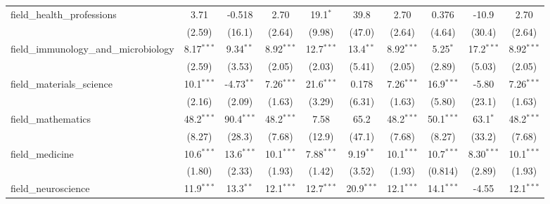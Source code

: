 \begin{tabular}{lccccccccc}
   field\_health\_professions                                  & 3.71          & -0.518         & 2.70          & 19.1$^{*}$    & 39.8           & 2.70          & 0.376         & -10.9          & 2.70\\   
                                                               & (2.59)        & (16.1)         & (2.64)        & (9.98)        & (47.0)         & (2.64)        & (4.64)        & (30.4)         & (2.64)\\   
   field\_immunology\_and\_microbiology                        & 8.17$^{***}$  & 9.34$^{**}$    & 8.92$^{***}$  & 12.7$^{***}$  & 13.4$^{**}$    & 8.92$^{***}$  & 5.25$^{*}$    & 17.2$^{***}$   & 8.92$^{***}$\\   
                                                               & (2.59)        & (3.53)         & (2.05)        & (2.03)        & (5.41)         & (2.05)        & (2.89)        & (5.03)         & (2.05)\\   
   field\_materials\_science                                   & 10.1$^{***}$  & -4.73$^{**}$   & 7.26$^{***}$  & 21.6$^{***}$  & 0.178          & 7.26$^{***}$  & 16.9$^{***}$  & -5.80          & 7.26$^{***}$\\   
                                                               & (2.16)        & (2.09)         & (1.63)        & (3.29)        & (6.31)         & (1.63)        & (5.80)        & (23.1)         & (1.63)\\   
   field\_mathematics                                          & 48.2$^{***}$  & 90.4$^{***}$   & 48.2$^{***}$  & 7.58          & 65.2           & 48.2$^{***}$  & 50.1$^{***}$  & 63.1$^{*}$     & 48.2$^{***}$\\   
                                                               & (8.27)        & (28.3)         & (7.68)        & (12.9)        & (47.1)         & (7.68)        & (8.27)        & (33.2)         & (7.68)\\   
   field\_medicine                                             & 10.6$^{***}$  & 13.6$^{***}$   & 10.1$^{***}$  & 7.88$^{***}$  & 9.19$^{**}$    & 10.1$^{***}$  & 10.7$^{***}$  & 8.30$^{***}$   & 10.1$^{***}$\\   
                                                               & (1.80)        & (2.33)         & (1.93)        & (1.42)        & (3.52)         & (1.93)        & (0.814)       & (2.89)         & (1.93)\\   
   field\_neuroscience                                         & 11.9$^{***}$  & 13.3$^{**}$    & 12.1$^{***}$  & 12.7$^{***}$  & 20.9$^{***}$   & 12.1$^{***}$  & 14.1$^{***}$  & -4.55          & 12.1$^{***}$\\   

\end{tabular}

